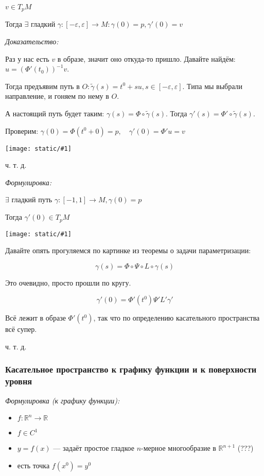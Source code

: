 \documentclass{article}
\def\image#1{\texttt{[image: static/\#1]}}
\begin{document}
$v \in T_p M$

Тогда $\exists $ гладкий $ \gamma: [-\varepsilon, \varepsilon] \rightarrow M: \gamma(0) = p, \gamma'(0) = v$

\textit{Доказательство:}

Раз у нас есть $v$ в образе, значит оно откуда-то пришло. Давайте найдём: $u = (\Phi'(t_0))^{-1} v$.

Тогда предъявим путь в $O: \widetilde{\gamma}(s) = t^0 + su, s \in [-\varepsilon, \varepsilon]$. Типа мы выбрали направление, и гоняем по нему в $O$.

А настоящий путь будет таким: $\gamma(s) = \Phi \circ \widetilde{\gamma}(s)$. Тогда $\gamma'(s) = \Phi' \circ \widetilde{\gamma}(s)$.

Проверим: $\gamma(0) = \Phi (t^0 + 0) = p, \quad \gamma'(0) = \Phi' u = v$

\image{lemm_gl_p.png}

ч. т. д.

\textit{Формулировка:}

$\exists $ гладкий путь $ \gamma: [-1, 1] \rightarrow M, \gamma(0) = p$

Тогда $\gamma'(0) \in T_p M$


\image{lemm_sk.png}

Давайте опять прогуляемся по картинке из теоремы о задачи параметризации: 

\[\gamma(s) = \Phi \circ \Psi \circ L \circ \gamma(s)\]

Это очевидно, просто прошли по кругу.

\[\gamma'(0) = \Phi'(t^0)\Psi' L' \gamma'\]

Всё лежит в образе $\Phi'(t^0)$, так что по определению касательного пространства всё супер.

ч. т. д.

\subsubsection{Касательное пространство к графику функции и к поверхности уровня}
\textit{Формулировка (к графику функции):}

\begin{itemize}
    \item $f: \mathbb{R}^n \rightarrow \mathbb{R}$
    \item $f \in C^1$
    \item $y = f(x)$ --- задаёт простое гладкое $n$-мерное многообразие в $\mathbb{R}^{n + 1}$ (???)
    \item есть точка $f(x^0) = y^0$
\end{itemize}
\end{document}
